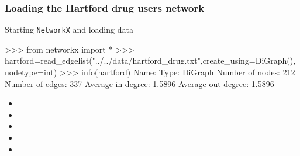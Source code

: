 \documentclass[xcolor=dvipsnames, 9pt]{beamer}
\newenvironment{code}{\begin{semiverbatim} \begin{footnotesize}}
{\end{footnotesize}\end{semiverbatim}}
\begin{document}
\begin{frame}[fragile]
    \frametitle{Loading the Hartford drug users network}
    \begin{block}{Starting \texttt{NetworkX} and loading data}
        \begin{code}
\scriptsize{>>> from networkx import *
>>> hartford=\alert<3>{read_edgelist}("\alert<4>{../../data/hartford_drug.txt}",\alert<5>{create_using=DiGraph()},\alert<6>{nodetype=int})
>>> \alert<7>{info(hartford)}
Name:                  
Type:                  DiGraph
Number of nodes:       212
Number of edges:       337
Average in degree:     1.5896
Average out degree:    1.5896}
        \end{code}
    \end{block}
\begin{itemize}
    \item {}
    \item {}
    \item {}
    \item {}
    \item {}
\end{itemize}
\end{frame}



\end{document}
